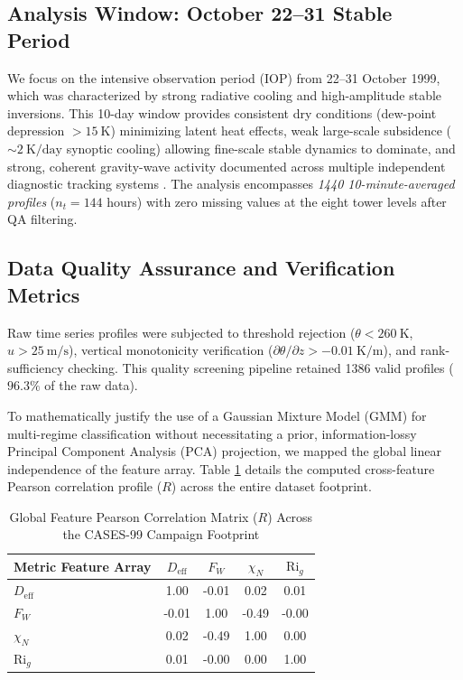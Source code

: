 \documentclass[11pt,a4paper]{article}
\begin{document}
\subsection{Analysis Window: October 22--31 Stable Period}

We focus on the intensive observation period (IOP) from 22--31 October 1999, which was characterized by strong radiative cooling and high-amplitude stable inversions. This 10-day window provides consistent dry conditions (dew-point depression $> \SI{15}{\kelvin}$) minimizing latent heat effects, weak large-scale subsidence ($\sim \SI{2}{\kelvin\per\text{day}}$ synoptic cooling) allowing fine-scale stable dynamics to dominate, and strong, coherent gravity-wave activity documented across multiple independent diagnostic tracking systems \citep{Poulos2002}. The analysis encompasses \emph{1440 10-minute-averaged profiles} ($n_t = 144$ hours) with zero missing values at the eight tower levels after QA filtering.

\subsection{Data Quality Assurance and Verification Metrics}

Raw time series profiles were subjected to threshold rejection ($\theta < \SI{260}{\kelvin}$, $u > \SI{25}{\meter\per\second}$), vertical monotonicity verification ($\partial \theta / \partial z > -\SI{0.01}{\kelvin\per\meter}$), and rank-sufficiency checking. This quality screening pipeline retained 1386 valid profiles ($96.3\%$ of the raw data). 

To mathematically justify the use of a Gaussian Mixture Model (GMM) for multi-regime classification without necessitating a prior, information-lossy Principal Component Analysis (PCA) projection, we mapped the global linear independence of the feature array. Table \ref{tab:correlation_matrix} details the computed cross-feature Pearson correlation profile ($R$) across the entire dataset footprint.

\begin{table}[h]
\centering
\caption{Global Feature Pearson Correlation Matrix ($R$) Across the CASES-99 Campaign Footprint}
\label{tab:correlation_matrix}
\begin{tabular}{l|cccc}
\hline
Metric Feature Array & $D_{\mathrm{eff}}$ & $F_W$ & $\chi_N$ & $\mathrm{Ri}_g$ \\
\hline
$D_{\mathrm{eff}}$   & 1.00 & -0.01 &  0.02 &  0.01 \\
$F_W$                & -0.01 &  1.00 & -0.49 & -0.00 \\
$\chi_N$             &  0.02 & -0.49 &  1.00 &  0.00 \\
$\mathrm{Ri}_g$      &  0.01 & -0.00 &  0.00 &  1.00 \\
\hline
\end{tabular}
\end{table}
\end{document}
